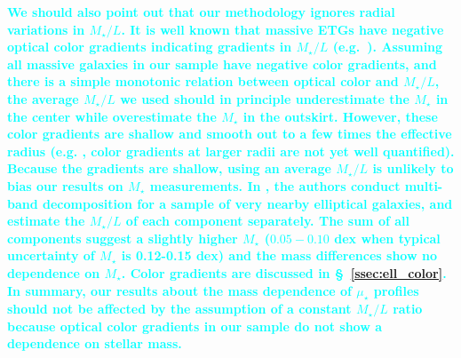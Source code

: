 \documentclass[a4paper,fleqn,usenatbib]{mnras}
\def\mstar{{$M_{\star}$}}
\def\m2l{{$M_{\star}/L$}}
\def\mden{{$\mu_{\star}$}}
\newcommand{\song}[1]{\textcolor{cyan}{\textbf{#1}}}
\begin{document}
    \song{
    We should also point out that our methodology ignores radial variations in \m2l{}. 
    It is well known that massive ETGs have negative optical color gradients 
    indicating gradients in \m2l{} (e.g.\ \citealt{Carollo1993, Davies1993, 
    LaBarbera2012, DSouza2015}). 
    Assuming all massive galaxies in our sample have negative color gradients, and 
    there is a simple monotonic relation between optical color and \m2l{}, the
    average \m2l{} we used should in principle underestimate the \mstar{} in the 
    center while overestimate the \mstar{} in the outskirt.
    However, these color gradients are shallow and smooth out to a few times the 
    effective radius (e.g. \citealt{LaBarbera2010, Tal2011, DSouza2014}, 
    color gradients at larger radii are not yet well quantified). 
    Because the gradients are shallow, using an average \m2l{} is unlikely to bias 
    our results on \mstar{} measurements.  
    In \citet{Huang2016}, the authors conduct multi-band decomposition for a sample 
    of very nearby elliptical galaxies, and estimate the \m2l{} of each component 
    separately. 
    The sum of all components suggest a slightly higher \mstar{} ($0.05-0.10$ dex 
    when typical uncertainty of \mstar{} is 0.12-0.15 dex) and the mass differences 
    show no dependence on \mstar{}. 
    Color gradients are discussed in \S~\ref{ssec:ell_color}. 
    In summary, our results about the mass dependence of \mden{} profiles should not 
    be affected by the assumption of a constant \m2l{} ratio because optical color 
    gradients in our sample do not show a dependence on stellar mass.
    }

     
\clearpage

\clearpage

\bsp
\label{lastpage}
\end{document}
